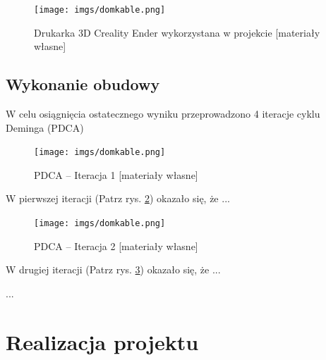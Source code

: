 \documentclass[a4paper,12pt,reqno]{article}
\begin{document}
\begin{figure}[!ht]%
\centering
\texttt{[image: imgs/domkable.png]}
\caption{Drukarka 3D Creality Ender wykorzystana w projekcie [materiały własne] \label{ender3d}}
\quad
\end{figure}

\subsection{Wykonanie obudowy}
W celu osiągnięcia ostatecznego wyniku przeprowadzono \textcolor{to_check_at_end}{4} iteracje cyklu Deminga (PDCA)

\begin{figure}[!ht]%
\centering
\texttt{[image: imgs/domkable.png]}
\caption{\textcolor{edited}{PDCA – Iteracja 1} [materiały własne] \label{PDCA_01}}
\quad
\end{figure}

W pierwszej iteracji (Patrz rys. \ref{PDCA_01}) okazało się, że ...

\begin{figure}[!ht]%
\centering
\texttt{[image: imgs/domkable.png]}
\caption{\textcolor{edited}{PDCA – Iteracja 2} [materiały własne] \label{PDCA_02}}
\quad
\end{figure}

W drugiej iteracji (Patrz rys. \ref{PDCA_02}) okazało się, że ...

...

\newpage
\section{Realizacja projektu} \label{section:realizacja}
\end{document}
